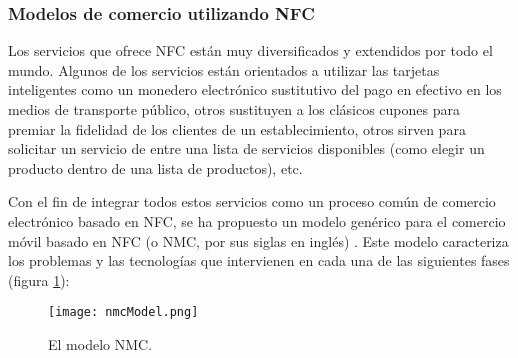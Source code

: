     \subsubsection{Modelos de comercio utilizando NFC}
  Los servicios que ofrece \acs{NFC} están muy diversificados y extendidos
  por todo el mundo. Algunos de los servicios están orientados a utilizar
  las tarjetas inteligentes como un monedero electrónico sustitutivo del
  pago en efectivo en los medios de transporte público, otros sustituyen
  a los clásicos cupones para premiar la fidelidad de los clientes de un
  establecimiento, otros sirven para solicitar un servicio de entre una
  lista de servicios disponibles (como elegir un producto dentro de una
  lista de productos), etc.

  Con el fin de integrar todos estos servicios como un proceso común de
  comercio electrónico basado en NFC, se ha propuesto un modelo genérico
  para el comercio móvil basado en \acs{NFC} (o \acs{NMC}, por sus siglas
  en inglés) \cite{bib:nfcCommerce}. Este modelo caracteriza los problemas y
  las tecnologías que intervienen en cada una de las siguientes fases
  (figura \ref{fig:nmcModel}):

  \begin{figure}[!h]
    \begin{center}
      \texttt{[image: nmcModel.png]}
      \caption{El modelo \acs{NMC}.}
      \label{fig:nmcModel}
    \end{center}
  \end{figure}

